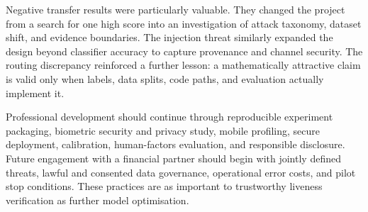 Negative transfer results were particularly valuable. They changed the project
from a search for one high score into an investigation of attack taxonomy,
dataset shift, and evidence boundaries. The injection threat similarly expanded
the design beyond classifier accuracy to capture provenance and channel security.
The routing discrepancy reinforced a further lesson: a mathematically attractive
claim is valid only when labels, data splits, code paths, and evaluation actually
implement it.

Professional development should continue through reproducible experiment
packaging, biometric security and privacy study, mobile profiling, secure
deployment, calibration, human-factors evaluation, and responsible disclosure.
Future engagement with a financial partner should begin with jointly defined
threats, lawful and consented data governance, operational error costs, and pilot
stop conditions. These practices are as important to trustworthy liveness
verification as further model optimisation.

